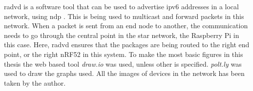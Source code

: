 \gls{radvd} is a software tool that can be used to advertise \gls{ipv6} addresses in a local network, using \gls{ndp} \cite{chown2011rogue}. This is being used to multicast and forward packets in this network. When a packet is sent from an end node to another, the communication needs to go through the central point in the star network, the Raspberry Pi in this case. Here, \gls{radvd} ensures that the packages are being routed to the right end point, or the right nRF52 in this system. To make the most basic figures in this thesis the web based tool \textit{draw.io} was used, unless other is specified. \textit{polt.ly} was used to draw the graphs used. All the images of devices in the network has been taken by the author. 


